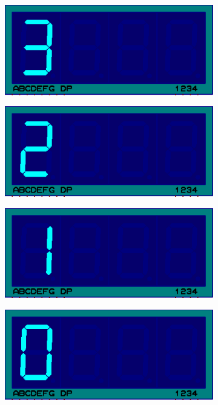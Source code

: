 \documentclass{lab_sheet}
\begin{document}
\begin{figure}[H]
\begin{subfigure}{.33\textwidth}
        \centering
        \includegraphics[frame,width=.9\linewidth]{../Figures/s3}   
        \caption{}
        \label{fig:prob1-p}
      \end{subfigure}
      \begin{subfigure}{.33\textwidth}
        \centering
        \includegraphics[frame,width=.9\linewidth]{../Figures/s2}   
        \caption{}
        \label{fig:prob1-q}
      \end{subfigure}
      \begin{subfigure}{.33\textwidth}
        \centering
        \includegraphics[frame,width=.9\linewidth]{../Figures/s1}   
        \caption{}
        \label{fig:prob1-r}
      \end{subfigure}
      \newline
      \hspace*{\fill}
      \begin{subfigure}{.33\textwidth}
        \centering
        \includegraphics[frame,width=.9\linewidth]{../Figures/s0}   

\end{subfigure}
\end{figure}
\end{document}
